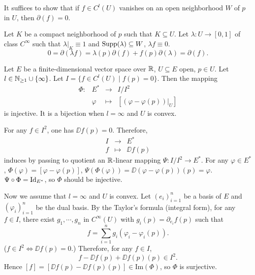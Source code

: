 \begin{proofenv}
    It suffices to show that if $f \in C^l(U)$ vanishes on an open neighborhood $W$ of $p$ in $U$, then $\partial(f) = 0$.

    \quad Let $K$ be a compact neighborhood of $p$ such that $K \subseteq U$.
    Let $\lambda : U \rightarrow [0,1]$ of class $C^\infty$ such that $\lambda|_K \equiv 1$ and $\operatorname{\mathrm{Supp}}(\lambda) \subseteq W$, $\lambda f \equiv 0$.
    $$0 = \partial(\lambda f) = \lambda(p) \partial(f) + f(p) \partial(\lambda) = \partial(f).$$
\end{proofenv}

\begin{propositionenv}
    Let $E$ be a finite-dimensional vector space over $\mathbb{R}$, $U \subseteq E$ open, $p \in U$.
    Let $l \in \mathbb{N}_{\ge 1} \cup \{\infty\}$.
    Let $I = \{f \in C^l(U) \mid f(p) = 0\}$.
    Then the mapping
    $$\begin{array}{rrcl}
        \Phi : & E^* & \longrightarrow & I/I^2\\
        & \varphi & \longmapsto & [(\varphi - \varphi(p))|_U]
    \end{array}$$
    is injective.
    It is a bijection when $l = \infty$ and $U$ is convex.
\end{propositionenv}
\begin{proofenv}
    For any $f \in I^2$, one has $\DD f(p) = 0$.
    Therefore,
    $$\begin{array}{rcl}
        I & \longrightarrow & E^*\\
        f & \longmapsto & \DD f(p)
    \end{array}$$
    induces by passing to quotient an $\mathbb{R}$-linear mapping $\Psi : I/I^2 \longrightarrow E^*$.
    For any $\varphi \in E^*$, $\Phi(\varphi) = [\varphi - \varphi(p)]$, $\Psi(\Phi(\varphi)) = \DD(\varphi - \varphi(p))(p) = \varphi$.
    $\Psi \circ \Phi = \operatorname{\mathrm{Id}}_{E^*}$, so $\Phi$ should be injective.
    
    \quad Now we assume that $l = \infty$ and $U$ is convex.
    Let $(e_i)_{i=1}^{n}$ be a basis of $E$ and $(\varphi_i)_{i=1}^{n}$ be the dual basis.
    By the Taylor's formula (integral form), for any $f \in I$, there exist $g_1,\cdots,g_n$ in $C^\infty(U)$ with $g_i(p) = \partial_{e_i} f(p)$ such that
    $$f = \sum_{i=1}^{n} g_i (\varphi_i - \varphi_i(p)).$$
    ($f \in I^2 \Leftrightarrow \DD f(p) = 0$.)
    Therefore, for any $f \in I$,
    $$f - \DD f(p) + \DD f(p)(p) \in I^2.$$
    Hence $[f] = [\DD f(p) - \DD f(p)(p)] \in \mathrm{Im} (\Phi)$, so $\Phi$ is surjective.
\end{proofenv}


